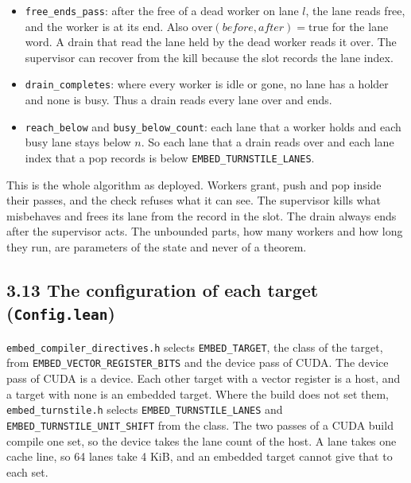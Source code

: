 \begin{itemize}
\item \texttt{free\_\allowbreak{}ends\_\allowbreak{}pass}: after the free of a dead worker on lane \(l\), the lane reads free, and the worker is at its end. Also \(\mathrm{over}(\mathit{before}, \mathit{after}) = \mathrm{true}\) for the lane word. A drain that read the lane held by the dead worker reads it over. The supervisor can recover from the kill because the slot records the lane index.
\item \texttt{drain\_\allowbreak{}completes}: where every worker is idle or gone, no lane has a holder and none is busy. Thus a drain reads every lane over and ends.
\item \texttt{reach\_\allowbreak{}below} and \texttt{busy\_\allowbreak{}below\_\allowbreak{}count}: each lane that a worker holds and each busy lane stays below \(n\). So each lane that a drain reads over and each lane index that a pop records is below \texttt{EMBED\_\allowbreak{}TURNSTILE\_\allowbreak{}LANES}.
\end{itemize}

This is the whole algorithm as deployed. Workers grant, push and pop inside their passes, and the check refuses what it can see. The supervisor kills what misbehaves and frees its lane from the record in the slot. The drain always ends after the supervisor acts. The unbounded parts, how many workers and how long they run, are parameters of the state and never of a theorem.

\subsection{\texorpdfstring{3.13 The configuration of each target (\texttt{Config.\allowbreak{}lean})}{3.13 The configuration of each target (Config.lean)}}

\texttt{embed\_\allowbreak{}compiler\_\allowbreak{}directives.\allowbreak{}h} selects \texttt{EMBED\_\allowbreak{}TARGET}, the class of the target, from \texttt{EMBED\_\allowbreak{}VECTOR\_\allowbreak{}REGISTER\_\allowbreak{}BITS} and the device pass of CUDA. The device pass of CUDA is a device. Each other target with a vector register is a host, and a target with none is an embedded target. Where the build does not set them, \texttt{embed\_\allowbreak{}turnstile.\allowbreak{}h} selects \texttt{EMBED\_\allowbreak{}TURNSTILE\_\allowbreak{}LANES} and \texttt{EMBED\_\allowbreak{}TURNSTILE\_\allowbreak{}UNIT\_\allowbreak{}SHIFT} from the class. The two passes of a CUDA build compile one set, so the device takes the lane count of the host. A lane takes one cache line, so 64 lanes take 4 KiB, and an embedded target cannot give that to each set.

